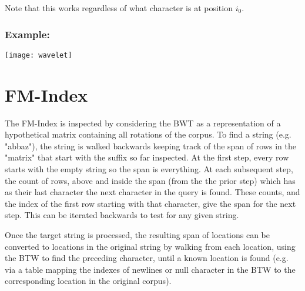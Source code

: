 \documentclass[12pt]{article}
\begin{document}
Note that this works regardless of what character is at position $i_0$.

\subsubsection{Example:}
\texttt{[image: wavelet]}

\section{FM-Index}

The FM-Index is inspected by considering the BWT as a representation of a
 hypothetical matrix containing all rotations of the corpus.
To find a string (e.g. "abbaz"), the string is walked backwards keeping track of
 the span of rows in the "matrix" that start with the suffix so far inspected.
At the first step, every row starts with the empty string so the span is everything.
At each subsequent step, the count of rows, above and inside the span (from the
 the prior step) which has as their last character the next character in the
 query is found.
These counts, and the index of the first row starting with that character, give
 the span for the next step.
This can be iterated backwards to test for any given string.

Once the target string is processed, the resulting span of locations can be
 converted to locations in the original string by walking from each location,
 using the BTW to find the preceding character, until a known location is found
 (e.g. via a table mapping the indexes of newlines or null character in the BTW
 to the corresponding location in the original corpus).
\end{document}

